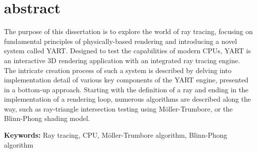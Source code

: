 
\chapter*{abstract}

The purpose of this dissertation is to explore the world of ray tracing, focusing on fundamental principles of physically-based rendering and introducing a novel system called YART.
Designed to test the capabilities of modern CPUs, YART is an interactive 3D rendering application with an integrated ray tracing engine. 
The intricate creation process of such a system is described by delving into implementation detail of various key components of the YART engine, presented in a bottom-up approach.
Starting with the definition of a ray and ending in the implementation of a rendering loop, numerous algorithms are described along the way, such as ray-triangle intersection testing using M{\"o}ller-Trumbore, or the Blinn-Phong shading model. 

\vspace*{1em}

\noindent\textbf{Keywords:} Ray tracing, CPU, M{\"o}ller-Trumbore algorithm, Blinn-Phong algorithm

\clearpage

